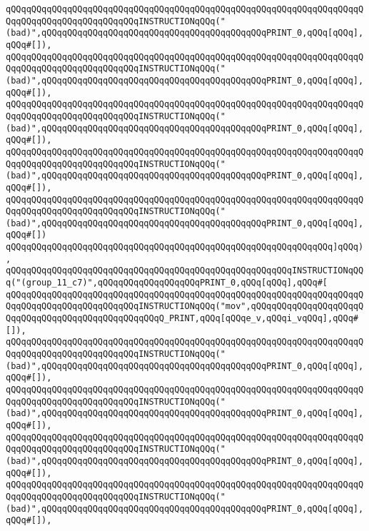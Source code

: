 \verb|qQQqqQQqqQQqqQQqqQQqqQQqqQQqqQQqqQQqqQQqqQQqqQQqqQQqqQQqqQQqqQQqqQQqqQQqqQQqqQQqqQQqqQQqqQQqqQQqINSTRUCTIONqQQq("(bad)",qQQqqQQqqQQqqQQqqQQqqQQqqQQqqQQqqQQqqQQqqQQqPRINT_0,qQQq[qQQq],qQQq#[]),|\newline
\verb|qQQqqQQqqQQqqQQqqQQqqQQqqQQqqQQqqQQqqQQqqQQqqQQqqQQqqQQqqQQqqQQqqQQqqQQqqQQqqQQqqQQqqQQqqQQqqQQqINSTRUCTIONqQQq("(bad)",qQQqqQQqqQQqqQQqqQQqqQQqqQQqqQQqqQQqqQQqqQQqPRINT_0,qQQq[qQQq],qQQq#[]),|\newline
\verb|qQQqqQQqqQQqqQQqqQQqqQQqqQQqqQQqqQQqqQQqqQQqqQQqqQQqqQQqqQQqqQQqqQQqqQQqqQQqqQQqqQQqqQQqqQQqqQQqINSTRUCTIONqQQq("(bad)",qQQqqQQqqQQqqQQqqQQqqQQqqQQqqQQqqQQqqQQqqQQqPRINT_0,qQQq[qQQq],qQQq#[]),|\newline
\verb|qQQqqQQqqQQqqQQqqQQqqQQqqQQqqQQqqQQqqQQqqQQqqQQqqQQqqQQqqQQqqQQqqQQqqQQqqQQqqQQqqQQqqQQqqQQqqQQqINSTRUCTIONqQQq("(bad)",qQQqqQQqqQQqqQQqqQQqqQQqqQQqqQQqqQQqqQQqqQQqPRINT_0,qQQq[qQQq],qQQq#[]),|\newline
\verb|qQQqqQQqqQQqqQQqqQQqqQQqqQQqqQQqqQQqqQQqqQQqqQQqqQQqqQQqqQQqqQQqqQQqqQQqqQQqqQQqqQQqqQQqqQQqqQQqINSTRUCTIONqQQq("(bad)",qQQqqQQqqQQqqQQqqQQqqQQqqQQqqQQqqQQqqQQqqQQqPRINT_0,qQQq[qQQq],qQQq#[])|\newline
\verb|qQQqqQQqqQQqqQQqqQQqqQQqqQQqqQQqqQQqqQQqqQQqqQQqqQQqqQQqqQQqqQQq]qQQq),|\newline
\verb|qQQqqQQqqQQqqQQqqQQqqQQqqQQqqQQqqQQqqQQqqQQqqQQqqQQqqQQqINSTRUCTIONqQQq("(group_11_c7)",qQQqqQQqqQQqqQQqqQQqPRINT_0,qQQq[qQQq],qQQq#[|\newline
\verb|qQQqqQQqqQQqqQQqqQQqqQQqqQQqqQQqqQQqqQQqqQQqqQQqqQQqqQQqqQQqqQQqqQQqqQQqqQQqqQQqqQQqqQQqqQQqqQQqINSTRUCTIONqQQq("mov",qQQqqQQqqQQqqQQqqQQqqQQqqQQqqQQqqQQqqQQqqQQqqQQqqQQqQ_PRINT,qQQq[qQQqe_v,qQQqi_vqQQq],qQQq#[]),|\newline
\verb|qQQqqQQqqQQqqQQqqQQqqQQqqQQqqQQqqQQqqQQqqQQqqQQqqQQqqQQqqQQqqQQqqQQqqQQqqQQqqQQqqQQqqQQqqQQqqQQqINSTRUCTIONqQQq("(bad)",qQQqqQQqqQQqqQQqqQQqqQQqqQQqqQQqqQQqqQQqqQQqPRINT_0,qQQq[qQQq],qQQq#[]),|\newline
\verb|qQQqqQQqqQQqqQQqqQQqqQQqqQQqqQQqqQQqqQQqqQQqqQQqqQQqqQQqqQQqqQQqqQQqqQQqqQQqqQQqqQQqqQQqqQQqqQQqINSTRUCTIONqQQq("(bad)",qQQqqQQqqQQqqQQqqQQqqQQqqQQqqQQqqQQqqQQqqQQqPRINT_0,qQQq[qQQq],qQQq#[]),|\newline
\verb|qQQqqQQqqQQqqQQqqQQqqQQqqQQqqQQqqQQqqQQqqQQqqQQqqQQqqQQqqQQqqQQqqQQqqQQqqQQqqQQqqQQqqQQqqQQqqQQqINSTRUCTIONqQQq("(bad)",qQQqqQQqqQQqqQQqqQQqqQQqqQQqqQQqqQQqqQQqqQQqPRINT_0,qQQq[qQQq],qQQq#[]),|\newline
\verb|qQQqqQQqqQQqqQQqqQQqqQQqqQQqqQQqqQQqqQQqqQQqqQQqqQQqqQQqqQQqqQQqqQQqqQQqqQQqqQQqqQQqqQQqqQQqqQQqINSTRUCTIONqQQq("(bad)",qQQqqQQqqQQqqQQqqQQqqQQqqQQqqQQqqQQqqQQqqQQqPRINT_0,qQQq[qQQq],qQQq#[]),|\newline
